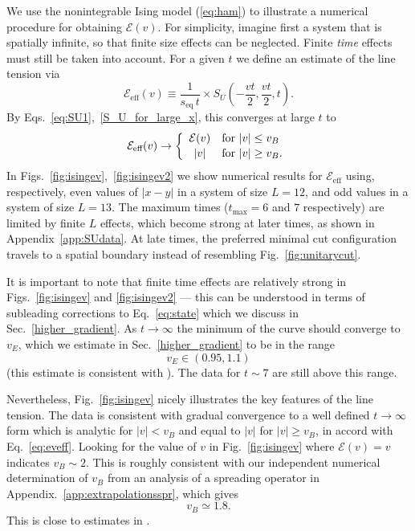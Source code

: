 \documentclass[aps,prx,twocolumn,superscriptaddress,floatfix,nofootinbib,prx]{revtex4}
\newcommand{\f}{\frac}
\renewcommand{\>}{\right\rangle}
\newcommand{\<}{\left\langle}
\newcommand{\be}{\begin{equation}}
\newcommand{\ee}{\end{equation}}
\newcommand{\lf}{\left(}
\newcommand{\ri}{\right)}
\newcommand{\seq}{s_\text{eq}}
\newcommand{\lt}{\mathcal{E}}
\begin{document}
We use the nonintegrable Ising model (\ref{eq:ham}) to illustrate a numerical procedure for obtaining $\lt(v)$.  For simplicity, imagine first a system that is spatially infinite, so that finite size effects can be neglected. Finite \textit{time} effects must still be taken into account. For a given $t$ we define an estimate of the line tension via
\be\label{eeffdefn}
\lt_\text{eff} (v)  \equiv \f{1}{\seq\, t} \times S_U \lf - \f{v t}{2} , \f{v t}{2} , t \ri.
\ee
By Eqs.~\ref{eq:SU1},~\ref{S_U_for_large_x}, this converges at large $t$ to 
\be\label{eq:eveff}
\lt_\text{eff}(v) \rightarrow
\left\{
\begin{array}{cc}
 \lt(v)& \text{for $|v|\leq v_B$\phantom{.}} \vspace{0.5mm}  \\ 
 |v| & \text{for $|v|\geq v_B$.}
\end{array}
\right.
\ee
In Figs.~\ref{fig:isingev},~\ref{fig:isingev2} we show numerical results for $\lt_\text{eff}$ using, respectively, even values of $|x-y|$ in a system of size $L=12$, and odd values in a system of size $L=13$. The maximum times ($t_\text{max} = 6$ and $7$ respectively) are limited by finite $L$ effects, which become strong at later times, as shown in  Appendix~\ref{app:SUdata}.  At late times, the preferred minimal cut configuration travels to a spatial boundary instead of resembling Fig.~\ref{fig:unitarycut}. 




It is important to note that finite time effects are relatively strong in Figs.~\ref{fig:isingev} and \ref{fig:isingev2} ---  this can be understood in terms of subleading corrections to Eq.~\ref{eq:state} which we discuss in Sec.~\ref{higher_gradient}. As $t\rightarrow\infty$ the minimum of the curve should converge to $v_E$, which we estimate in Sec.~\ref{higher_gradient} to be in the range 
\be
v_E \in (0.95, 1.1)
\ee
(this estimate is consistent with \cite{ms}). The data for $t\sim 7$ are still above this range.

Nevertheless, Fig.~\ref{fig:isingev} nicely illustrates the key features of the line tension. The data is consistent with gradual convergence to a well defined $t\rightarrow \infty$ form which is analytic for $|v|< v_B$ and equal to $|v|$ for $|v|\geq v_B$, in accord with Eq.~\ref{eq:eveff}. Looking for the value of $v$ in Fig.~\ref{fig:isingev} where $\lt(v)=v$ indicates $v_B \sim 2$. This is roughly consistent with our independent numerical determination of $v_B$ from an analysis of a spreading operator in Appendix.~\ref{app:extrapolationsspr}, which gives
\be
v_B \simeq 1.8.
\ee
This is close to estimates in \cite{ms}.
\end{document}

